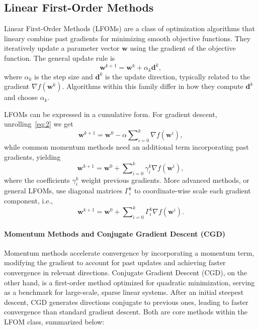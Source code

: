 \documentclass[11pt]{article}
\numberwithin{equation}{section}
\begin{document}
\subsection{Linear First-Order Methods}
Linear First-Order Methods (LFOMs) \citep{goh2017why} are a class of optimization algorithms that lineary combine past gradients for minimizing smooth objective functions. They iteratively update a parameter vector \(\mathbf{w}\) using the gradient of the objective function. The general update rule is
\begin{equation}
\label{eq:2}
\mathbf{w}^{k+1} = \mathbf{w}^k + \alpha_k \mathbf{d}^k,
\end{equation}
where \(\alpha_k\) is the step size and \(\mathbf{d}^k\) is the update direction, typically related to the gradient \(\nabla f(\mathbf{w}^k)\). Algorithms within this family differ in how they compute \(\mathbf{d}^k\) and choose \(\alpha_k\).

LFOMs can be expressed in a cumulative form. For gradient descent, unrolling~\eqref{eq:2} we get
\begin{equation}
\mathbf{w}^{k+1} = \mathbf{w}^0 - \alpha \sum\nolimits_{i=0}^{k} \nabla f(\mathbf{w}^i),
\end{equation}
while common momentum methods need an additional term incorporating past gradients, yielding
\begin{equation}
\mathbf{w}^{k+1} = \mathbf{w}^0 + \sum\nolimits_{i=0}^{k} \gamma_i^k \nabla f(\mathbf{w}^i),
\end{equation}
where the coefficients \(\gamma_i^k\) weight previous gradients. More advanced methods, or general LFOMs, use diagonal matrices \(\Gamma_i^k\) to coordinate-wise scale each gradient component, i.e.,
\begin{equation}
\mathbf{w}^{k+1} = \mathbf{w}^0 + \sum\nolimits_{i=0}^{k} \Gamma_i^k \nabla f(\mathbf{w}^i).
\end{equation}
\paragraph{Momentum Methods and Conjugate Gradient Descent (CGD)}
Momentum methods accelerate convergence by incorporating a momentum term, modifying the gradient to account for past updates and achieving faster convergence in relevant directions. Conjugate Gradient Descent (CGD), on the other hand, is a first-order method optimized for quadratic minimization, serving as a benchmark for large-scale, sparse linear systems. After an initial steepest descent, CGD generates directions conjugate to previous ones, leading to faster convergence than standard gradient descent. Both are core methods within the LFOM class, summarized below:
\end{document}
